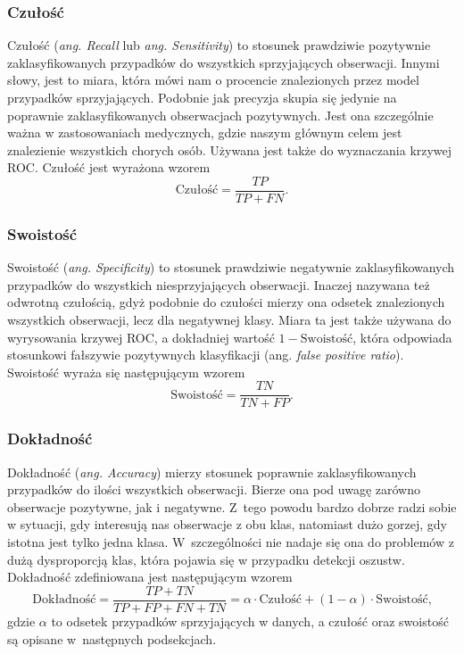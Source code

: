 \documentclass[inzynierska]{pwr_wmat_praca_dyplomowa}
\theoremstyle{plain}
\numberwithin{theorem}{chapter}
\theoremstyle{definition}
\numberwithin{theorem}{chapter}
\begin{document}
\subsubsection{Czułość}
Czułość (\textit{ang. Recall} lub \textit{ang. Sensitivity}) to stosunek prawdziwie pozytywnie zaklasyfikowanych przypadków do wszystkich sprzyjających obserwacji. Innymi słowy, jest to miara, która mówi nam o procencie znalezionych przez model przypadków sprzyjających. Podobnie jak precyzja skupia się jedynie na poprawnie zaklasyfikowanych obserwacjach pozytywnych. Jest ona szczególnie ważna w zastosowaniach medycznych, gdzie naszym głównym celem jest znalezienie wszystkich chorych osób. Używana jest także do wyznaczania krzywej ROC. Czułość jest wyrażona wzorem
$$ \text{Czułość}= \frac{TP}{TP + FN} \text{.}$$

\subsubsection{Swoistość}
Swoistość (\textit{ang. Specificity}) to stosunek prawdziwie negatywnie zaklasyfikowanych przypadków do wszystkich niesprzyjających obserwacji. Inaczej nazywana też odwrotną czułością, gdyż podobnie do czułości mierzy ona odsetek znalezionych wszystkich obserwacji, lecz dla negatywnej klasy. Miara ta jest także używana do wyrysowania krzywej ROC, a dokładniej wartość $1- \text{Swoistość}$, która odpowiada stosunkowi fałszywie pozytywnych klasyfikacji (ang. \textit{false positive ratio}). Swoistość wyraża się następującym wzorem
$$ \text{Swoistość}= \frac{TN}{TN + FP} \text{.}$$

\subsubsection{Dokładność}
Dokładność (\textit{ang. Accuracy}) mierzy stosunek poprawnie zaklasyfikowanych przypadków do ilości wszystkich obserwacji. Bierze ona pod uwagę zarówno obserwacje pozytywne, jak i negatywne. Z~tego powodu bardzo dobrze radzi sobie w sytuacji, gdy interesują nas obserwacje z obu klas, natomiast dużo gorzej, gdy istotna jest tylko jedna klasa. W~szczególności nie nadaje się ona do problemów z dużą dysproporcją klas, która pojawia się w przypadku detekcji oszustw. Dokładność zdefiniowana jest następującym wzorem
$$ \text{Dokładność} = \frac{TP + TN}{TP + FP + FN + TN} = \alpha \cdot \text{Czułość} + (1-\alpha) \cdot \text{Swoistość} \text{,}$$
gdzie $\alpha$ to odsetek przypadków sprzyjających w danych, a czułość oraz swoistość są opisane w~następnych podsekcjach. 
\end{document}
